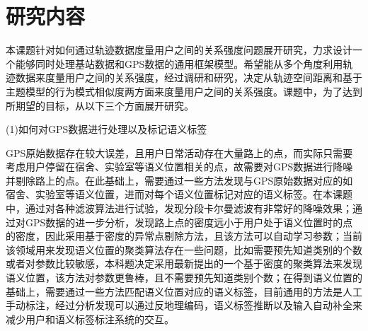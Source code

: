 \section{研究内容}
本课题针对如何通过轨迹数据度量用户之间的关系强度问题展开研究，力求设计一个能够同时处理基站数据和GPS数据的通用框架模型。希望能从多个角度利用轨迹数据来度量用户之间的关系强度，经过调研和研究，决定从轨迹空间距离和基于主题模型的行为模式相似度两方面来度量用户之间的关系强度。课题中，为了达到所期望的目标，从以下三个方面展开研究。
\par (1)如何对GPS数据进行处理以及标记语义标签
\par GPS原始数据存在较大误差，且用户日常活动存在大量路上的点，而实际只需要考虑用户停留在宿舍、实验室等语义位置相关的点，故需要对GPS数据进行降噪并剔除路上的点。在此基础上，需要通过一些方法发现与GPS原始数据对应的如宿舍、实验室等语义位置，进而对每个语义位置标记对应的语义标签。在本课题中，通过对各种滤波算法进行试验，发现分段卡尔曼滤波有非常好的降噪效果；通过对GPS数据的进一步分析，发现路上点的密度远小于用户处于语义位置时的点的密度，因此采用基于密度的异常点剔除方法，且该方法可以自动学习参数；当前该领域用来发现语义位置的聚类算法存在一些问题，比如需要预先知道类别的个数或者对参数比较敏感，本科题决定采用最新提出的一个基于密度的聚类算法来发现语义位置，该方法对参数更鲁棒，且不需要预先知道类别个数；在得到语义位置的基础上，需要通过一些方法匹配语义位置对应的语义标签，目前通用的方法是人工手动标注，经过分析发现可以通过反地理编码，语义标签推断以及输入自动补全来减少用户和语义标签标注系统的交互。

